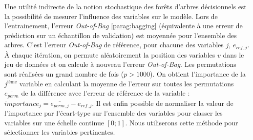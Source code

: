 Une utilité indirecte de la notion stochastique des forêts d'arbres décisionnels est la possibilité de mesurer l'influence des variables sur le modèle.
Lors de l'entrainement, l'erreur \textit{Out-of-Bag} \ref{parag:bagging} (équivalente à une erreur de prédiction sur un échantillon de validation) est moyennée pour l'ensemble des arbres.
C'est l'erreur \textit{Out-of-Bag} de référence, pour chacune des variables $j$, $e_{ref, j}$.
À chaque itération, on permute aléatoirement la position des variables $v$ dans le jeu de données et on calcule à nouveau l'erreur \textit{Out-of-Bag}.
Les permutations sont réalisées un grand nombre de fois ($p > 1000$).
On obtient l'importance de la $j^{\text{ième}}$ variable en calculant la moyenne de l'erreur sur toutes les permutations $\bar{e_{perm}}$ de la différence avec l'erreur de référence de la variable : $importance_{j} = \bar{e_{perm, j}} - e_{ref, j}$.
Il est enfin possible de normaliser la valeur de l'importance par l'écart-type sur l'ensemble des variables pour classer les variables sur une échelle continue $[0 ; 1]$.
Nous utiliserons cette méthode pour sélectionner les variables pertinentes.

